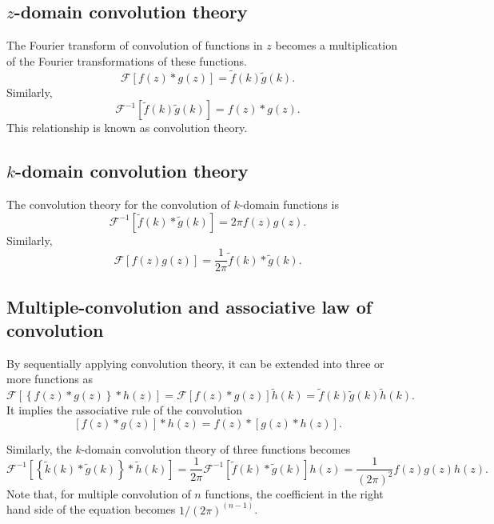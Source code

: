 \documentclass[a4paper]{article}
\newcommand{\ftf}[1]{{\mathcal{F}\left[#1\right]\xspace}}
\newcommand{\iftf}[1]{{\mathcal{F}^{-1}\left[#1\right]\xspace}}
\newcommand{\ftt}[1]{{\tilde{#1}\xspace}}
\begin{document}
\subsection{$z$-domain convolution theory}
The Fourier transform of convolution of functions in $z$ becomes a multiplication of the Fourier transformations of these functions.
\begin{equation}
	\ftf{f(z)*g(z)} = \ftt{f}(k) \ftt{g}(k).
\end{equation}
Similarly,
\begin{equation}
	\iftf{\ftt{f}(k)\ftt{g}(k)} = f(z)*g(z).
\end{equation}
This relationship is known as convolution theory.

\subsection{$k$-domain convolution theory}
The convolution theory for the convolution of $k$-domain functions is
\begin{equation}
	\iftf{\ftt{f}(k)*\ftt{g}(k)} = 2\pi f(z) g(z).
\end{equation}
Similarly,
\begin{equation}
	\ftf{{f}(z)g(z)} = \frac{1}{2\pi}\ftt{f}(k)*\ftt{g}(k).
\end{equation}
\subsection{Multiple-convolution and associative law of convolution}
By sequentially applying convolution theory, it can be extended into three or more functions as
\begin{equation}
	\ftf{\left\{f(z) * g(z)\right\} * h(z)}
	 = \ftf{f(z) * g(z)}\ftt{h}(k) = \ftt{f}(k)\ftt{g}(k)\ftt{h}(k).
\end{equation}
It implies the associative rule of the convolution
\begin{equation}
	\left[f(z)*g(z)\right]*h(z)=f(z)*\left[g(z)*h(z)\right].
\end{equation}

Similarly, the $k$-domain convolution theory of three functions becomes
\begin{equation}
	\iftf{\left\{\ftt{k}(k)* \ftt{g}(k)\right\}*\ftt{h}(k)}
	= \frac{1}{2\pi}\iftf{\ftt{f}(k)*\ftt{g}(k)}h(z) = \frac{1}{\left(2\pi\right)^2}f(z)g(z)h(z).
\end{equation}
Note that, for multiple convolution of $n$ functions, the coefficient in the right hand side of the equation becomes $1/(2\pi)^{(n-1)}$.
\end{document}

